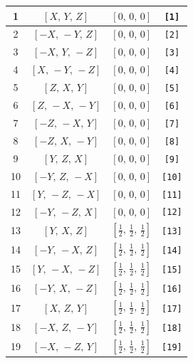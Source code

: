 \documentclass[fleqn,8pt]{jsarticle}
\begin{document}
\begin{longtable}{cccc}
1 & $\left[ X,\, Y,\, Z \right]$ & $\left[ 0,\, 0,\, 0 \right]$ & {\tt [1]} \\ \hline
2 & $\left[ - X,\, - Y,\, Z \right]$ & $\left[ 0,\, 0,\, 0 \right]$ & {\tt [2]} \\ \hline
3 & $\left[ - X,\, Y,\, - Z \right]$ & $\left[ 0,\, 0,\, 0 \right]$ & {\tt [3]} \\ \hline
4 & $\left[ X,\, - Y,\, - Z \right]$ & $\left[ 0,\, 0,\, 0 \right]$ & {\tt [4]} \\ \hline
5 & $\left[ Z,\, X,\, Y \right]$ & $\left[ 0,\, 0,\, 0 \right]$ & {\tt [5]} \\ \hline
6 & $\left[ Z,\, - X,\, - Y \right]$ & $\left[ 0,\, 0,\, 0 \right]$ & {\tt [6]} \\ \hline
7 & $\left[ - Z,\, - X,\, Y \right]$ & $\left[ 0,\, 0,\, 0 \right]$ & {\tt [7]} \\ \hline
8 & $\left[ - Z,\, X,\, - Y \right]$ & $\left[ 0,\, 0,\, 0 \right]$ & {\tt [8]} \\ \hline
9 & $\left[ Y,\, Z,\, X \right]$ & $\left[ 0,\, 0,\, 0 \right]$ & {\tt [9]} \\ \hline
10 & $\left[ - Y,\, Z,\, - X \right]$ & $\left[ 0,\, 0,\, 0 \right]$ & {\tt [10]} \\ \hline
11 & $\left[ Y,\, - Z,\, - X \right]$ & $\left[ 0,\, 0,\, 0 \right]$ & {\tt [11]} \\ \hline
12 & $\left[ - Y,\, - Z,\, X \right]$ & $\left[ 0,\, 0,\, 0 \right]$ & {\tt [12]} \\ \hline
13 & $\left[ Y,\, X,\, Z \right]$ & $\left[ \frac{1}{2},\, \frac{1}{2},\, \frac{1}{2} \right]$ & {\tt [13]} \\ \hline
14 & $\left[ - Y,\, - X,\, Z \right]$ & $\left[ \frac{1}{2},\, \frac{1}{2},\, \frac{1}{2} \right]$ & {\tt [14]} \\ \hline
15 & $\left[ Y,\, - X,\, - Z \right]$ & $\left[ \frac{1}{2},\, \frac{1}{2},\, \frac{1}{2} \right]$ & {\tt [15]} \\ \hline
16 & $\left[ - Y,\, X,\, - Z \right]$ & $\left[ \frac{1}{2},\, \frac{1}{2},\, \frac{1}{2} \right]$ & {\tt [16]} \\ \hline
17 & $\left[ X,\, Z,\, Y \right]$ & $\left[ \frac{1}{2},\, \frac{1}{2},\, \frac{1}{2} \right]$ & {\tt [17]} \\ \hline
18 & $\left[ - X,\, Z,\, - Y \right]$ & $\left[ \frac{1}{2},\, \frac{1}{2},\, \frac{1}{2} \right]$ & {\tt [18]} \\ \hline
19 & $\left[ - X,\, - Z,\, Y \right]$ & $\left[ \frac{1}{2},\, \frac{1}{2},\, \frac{1}{2} \right]$ & {\tt [19]} \\ \hline

\end{longtable}
\end{document}
